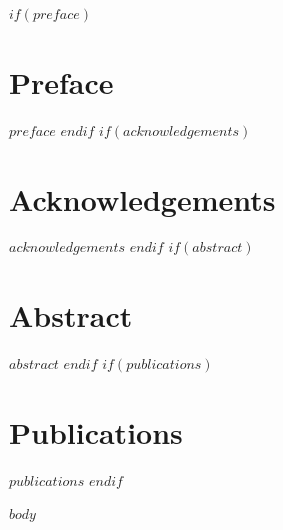 \documentclass[12pt, final]{extbook}
\begin{document}


\makefront

$if(preface)$
\chapter*{Preface}
$preface$
$endif$
$if(acknowledgements)$
\chapter*{Acknowledgements}
$acknowledgements$
$endif$
$if(abstract)$
\chapter*{Abstract}
$abstract$
$endif$
$if(publications)$
\chapter*{Publications}
$publications$
$endif$

\tableofcontents
\listoffigures
\listoftables

\configureMainPart

$body$
\end{document}
